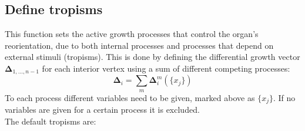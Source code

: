 \documentclass[a4paper, 11pt]{article}
\begin{document}
\newpage

\subsection*{Define tropisms}
This function sets the active growth processes that control the organ's reorientation, due to both internal processes and processes that depend on external stimuli (tropisms). This is done by defining the differential growth vector $\boldsymbol{\Delta}_{1,...,n-1}$ for each interior vertex using a sum of different competing processes:
\begin{equation}
    \boldsymbol{\Delta}_i=\sum_m\boldsymbol{\Delta}^m_i(\{x_j\})
\end{equation}
To each process different variables need to be given, marked above as $\{x_j\}$. If no variables are given for a certain process it is excluded. \\
The default tropisms are:
\end{document}
